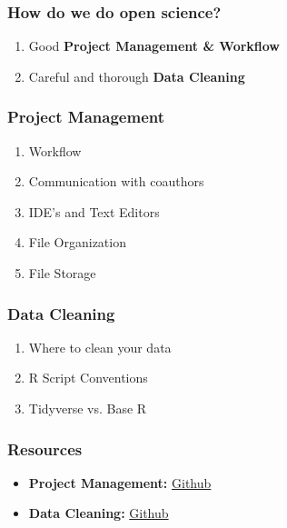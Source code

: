 \documentclass{beamer}
\begin{document}
	\begin{frame}
		\frametitle{How do we do open science?}
		\begin{enumerate}
			\item Good \textbf{Project Management \& Workflow}
			\item Careful and thorough \textbf{Data Cleaning}
		\end{enumerate}
	\end{frame}
	\begin{frame}
		\frametitle{Project Management}
		\begin{enumerate}
			\item Workflow
			\item Communication with coauthors
			\item IDE's and Text Editors
			\item File Organization
			\item File Storage
		\end{enumerate}
	\end{frame}
	\begin{frame}
		\frametitle{Data Cleaning}
		\begin{enumerate}
			\item Where to clean your data
			\item R Script Conventions
			\item Tidyverse vs. Base R
		\end{enumerate}
	\end{frame}
	\begin{frame}
		\frametitle{Resources}
		\begin{itemize}
			\item \textbf{Project Management:} \href{}{Github}
			\item \textbf{Data Cleaning:}
			 \href{}{Github}
		\end{itemize}	
	\end{frame}
\end{document}
